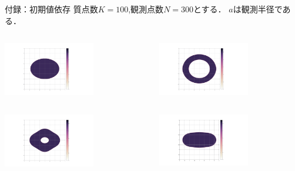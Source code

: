 \documentclass[dvipdfmx]{beamer}
\theoremstyle{remark}
\begin{document}
\begin{frame}[noframenumbering]{付録：初期値依存}
  質点数$K=100$,観測点数$N=300$とする．
  $a$は観測半径である．

  \begin{columns}
    \begin{column}{0.38\columnwidth}
      \setcounter{figure}{5}
      \centering
      \includegraphics[width=4cm]{fig/elliptic.png}
      \captionsetup[figure]{labelformat=empty,labelsep=none}
    \end{column}
    \hspace{-1cm}
    \begin{column}{0.38\columnwidth}
      \setcounter{figure}{9}
      \centering
      \includegraphics[width=4cm]{fig/PN300K100R4E2.png}
      \captionsetup[figure]{labelformat=empty,labelsep=none}
    \end{column}
  \end{columns}

  \begin{columns}
    \begin{column}{0.38\columnwidth}
      \centering
      \includegraphics[width=4cm]{fig/PN300K100R10E2.png}
      \captionsetup[figure]{labelformat=empty,labelsep=none}
    \end{column}
    \hspace{-1cm}
    \begin{column}{0.38\columnwidth}
      \centering
      \includegraphics[width=4cm]{fig/PN300K100R30E2.png}
      \captionsetup[figure]{labelformat=empty,labelsep=none}
    \end{column}
  \end{columns}

\end{frame}
\end{document}
